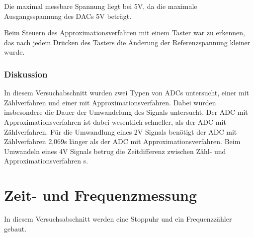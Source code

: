 \documentclass[12pt,a4paper]{article}
\begin{document}
Die maximal messbare Spannung liegt bei 5V, da die maximale Ausgangsspannung des DACs 5V beträgt.

Beim Steuern des Approximationsverfahren mit einem Taster war zu erkennen, das nach jedem Drücken des Tasters die Änderung der Referenzspannung kleiner wurde.

\subsubsection*{Diskussion}

In diesem Versuchabschnitt wurden zwei Typen von ADCs untersucht, einer mit Zählverfahren und einer mit Approximationsverfahren. Dabei wurden insbesondere die Dauer der Umwandelung des Signals untersucht. Der ADC mit Approximationsverfahren ist dabei wesentlich schneller, als der ADC mit Zählverfahren. Für die Umwandlung eines 2V Signals benötigt der ADC mit Zählverfahren 2,069s länger als der ADC mit Approximationsverfahren. Beim Umwandeln eines 4V Signals betrug die Zeitdifferenz zwischen Zähl- und Approximationsverfahren \unit[1]{s}. 




\section{Zeit- und Frequenzmessung}

In diesem Versuchsabschnitt werden eine Stoppuhr und ein Frequenzzähler gebaut.
\end{document}
